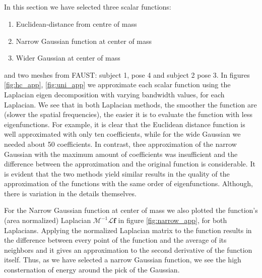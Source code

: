 \subsection{}\label{subsec:app}
In this section we have selected three scalar functions:
\begin{enumerate}
    \item Euclidean-distance from centre of mass
    \item Narrow Gaussian function at center of mass
    \item Wider Gaussian at center of mass
\end{enumerate}
and two meshes from FAUST: subject 1, pose 4 and subject 2 pose 3.
In figures \ref{fig:hc_app}, \ref{fig:uni_app} we approximate each scalar function using the Laplacian eigen decomposition with varying bandwidth values, for each Laplacian. We see that in both Laplacian methods, the smoother the function are (slower the spatial frequencies), the easier it is to evaluate the function with less eigenfunctions. For example, it is clear that the Euclidean distance function is well approximated with only ten coefficients, while for the wide Gaussian we needed about 50 coefficients. In contrast, thee approximation of the narrow Gaussian with the maximum amount of coefficients was insufficient and the difference between the approximation and the original function is considerable. It is evident that the two methods yield similar results in the quality of the approximation of the functions with the same order of eigenfunctions. Although, there is variation in the details themselves.

For the Narrow Gaussian function at center of mass we also plotted the function’s (area normalized) Laplacian \(\mathcal{M}^{-1}\mathcal{L}\mathbf{f}\) in figure \ref{fig:narrow_app}, for both Laplacians. Applying the normalized Laplacian matrix to the function results in the difference between every point of the function and the average of its neighbors and it gives an approximation to the second derivative of the function itself. Thus, as we have selected a narrow Gaussian function, we see the high consternation of energy around the pick of the Gaussian.

